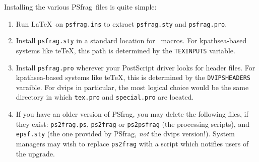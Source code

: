 \documentclass[11pt]{ltxguide}
\let\pkg\textsf
\let\fname\texttt
\newcommand{\pfg}{\pkg{PSfrag}}
\begin{document}
Installing the various \pfg\ files is quite simple:
\begin{enumerate}
\item Run \LaTeX\ on \fname{psfrag.ins} to extract
      \fname{psfrag.sty} and \fname{psfrag.pro}.
\item Install \fname{psfrag.sty} in a standard location for
      \LaTeXe\ macros. For \pkg{kpathsea}-based systems like
      \pkg{te\TeX}, this path is determined by the
      \texttt{TEXINPUTS} variable.
\item Install \fname{psfrag.pro} wherever your PostScript driver
      looks for header files. For \pkg{kpathsea}-based systems
	  like \pkg{te\TeX}, this is determined by the \texttt{DVIPSHEADERS}
	  varaible. For \pkg{dvips} in particular, the most logical choice would
      be the same directory in which \fname{tex.pro} and
      \fname{special.pro} are located.
\item If you have an older version of \pfg, you may delete the
   following files, if they exist: \fname{ps2frag.ps}, \fname{ps2frag}
   or \fname{ps2psfrag} (the processing scripts),
   and \fname{epsf.sty} (the one provided by \pfg,
   \emph{not} the \pkg{dvips} version!). System managers may wish to
   replace \fname{ps2frag} with a script which notifies users of the
   upgrade.
\end{enumerate}
\end{document}
